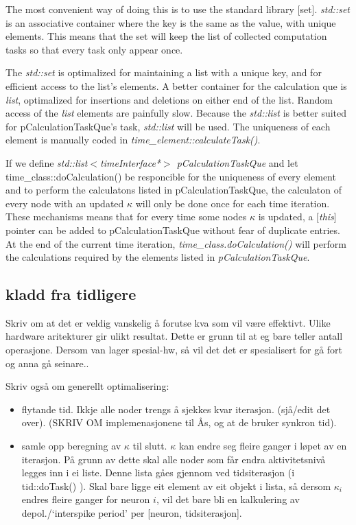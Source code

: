 The most convenient way of doing this is to use the standard library [set]. %
\emph{std::set} is an associative container where the key is the same as the value, with unique elements. %
This means that the set will keep the list of collected computation tasks so that every task only appear once.

The \emph{std::set} is optimalized for maintaining a list with a unique key, and for efficient access to the list's elements. 
A better container for the calculation que is \emph{list}, optimalized for insertions and deletions on either end of the list. Random access of the \emph{list} elements are painfully slow\cite{Stroustrup2000KAP17}.
Because the \emph{std::list} is better suited for pCalculationTaskQue's task, \emph{std::list} will be used.
The uniqueness of each element is manually coded in \emph{time\_element::calculateTask()}.

If we define \emph{std::list$<$timeInterface*$>$ pCalculationTaskQue} and let time\_class::doCalculation() be responcible for the uniqueness of every element and to perform the calculatons listed in pCalculationTaskQue, 
	the calculaton of every node with an updated $\kappa$ will only be done once for each time iteration.
These mechanisms means that for every time some nodes $\kappa$ is updated, a [\emph{this}] pointer can be added to pCalculationTaskQue without fear of duplicate entries. 
At the end of the current time iteration, \emph{time\_class.doCalculation()} will perform the calculations required by the elements listed in \emph{pCalculationTaskQue}.    %




\subsection{kladd fra tidligere}
Skriv om at det er veldig vanskelig å forutse kva som vil være effektivt. Ulike hardware aritekturer gir  ulikt resultat. Dette er grunn til at eg bare teller antall operasjone. Dersom van lager spesial-hw, så vil det det er spesialisert for gå fort og anna gå seinare..

Skriv også om generellt optimalisering:
\begin{itemize}
	\item flytande tid. Ikkje alle noder trengs å sjekkes kvar iterasjon. (sjå/edit det over). (SKRIV OM implemenasjonene til Ås, og at de bruker synkron tid).
	\item samle opp beregning av $\kappa$ til slutt. $\kappa$ kan endre seg fleire ganger i løpet av en iterasjon. På grunn av dette skal alle noder som får endra aktivitetsnivå legges inn i ei liste. Denne lista gåes gjennom ved tidsiterasjon (i tid::doTask() ). Skal bare ligge eit element av eit objekt i lista, så dersom $\kappa_i$ endres fleire ganger for neuron $i$, vil det bare bli en kalkulering av depol./`interspike period' per [neuron, tidsiterasjon].
\end{itemize}

